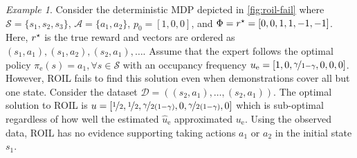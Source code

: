 \documentclass[10pt]{article}
\theoremstyle{plain}
\theoremstyle{remark}
\newtheorem{example}{Example}
\begin{document}
\begin{example} \label{exm:roil-limitations}
Consider the deterministic MDP depicted in \cref{fig:roil-fail} where $\mathcal{S} = \{s_1, s_2, s_3\}$, $\mathcal{A} = \{a_1, a_2\}$, $p_0 = [1,0,0]$, and $\Phi = r^{\mathnormal{\star}} = [0,0,1,1,-1,-1]$. Here, $r^{\mathnormal{\star}}$ is the true reward and vectors are ordered as $(s_1,a_1), (s_1, a_2), (s_2,a_1), \dots $. Assume that the expert follows the optimal policy $\pi_{\mathrm{e}}(s) = a_1, \forall s\in \mathcal{S}$ with an occupancy frequency $u_{\mathrm{e}} = [1,0,\nicefrac{\gamma}{1-\gamma},0,0,0]$. However, ROIL fails to find this solution even when demonstrations cover all but one state. Consider the dataset $\mathcal{D} = ((s_2, a_1),  \dots, (s_2, a_1))$. The optimal solution to ROIL is $u = [\nicefrac{1}{2},\nicefrac{1}{2},\nicefrac{\gamma}{2(1-\gamma)},0,\nicefrac{\gamma}{2(1-\gamma)},0]$ which is sub-optimal regardless of how well the estimated $\hat{u}_{\mathrm{e}}$ approximated $u_{\mathrm{e}}$. Using the observed data, ROIL has no evidence supporting taking actions $a_1$ or $a_2 $ in the initial state $s_1$.
\end{example} 
\end{document}
